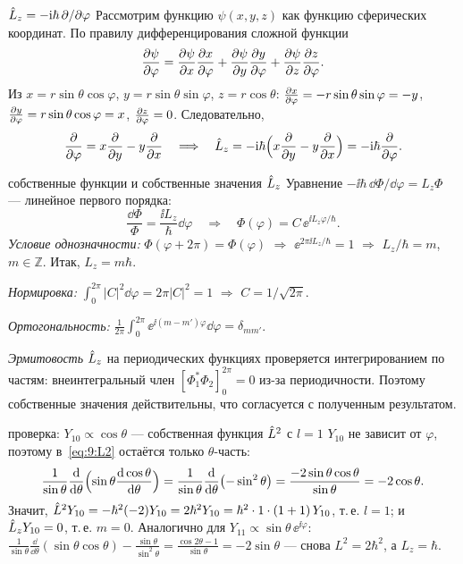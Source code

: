 \begin{derivation}[label=der:9:Lz]{$\hat{L}_z=-\mathrm{i}\hbar\,\partial/\partial\varphi$}
Рассмотрим функцию $\psi(x,y,z)$ как функцию сферических координат. По правилу дифференцирования
сложной функции
\[
  \frac{\partial \psi}{\partial \varphi}=\frac{\partial \psi}{\partial x}\frac{\partial x}{\partial \varphi}+\frac{\partial \psi}{\partial y}\frac{\partial y}{\partial \varphi}+\frac{\partial \psi}{\partial z}\frac{\partial z}{\partial \varphi}.
\]
Из $x=r\sin\theta\cos\varphi$, $y=r\sin\theta\sin\varphi$, $z=r\cos\theta$:
$\frac{\partial x}{\partial \varphi}=-r\sin\theta\sin\varphi=-y$, $\frac{\partial y}{\partial \varphi}=r\sin\theta\cos\varphi=x$, $\frac{\partial z}{\partial \varphi}=0$. Следовательно,
\[
  \frac{\partial }{\partial \varphi}=x\frac{\partial }{\partial y}-y\frac{\partial }{\partial x}\quad\Longrightarrow\quad
  \hat{L}_z=-\mathrm{i}\hbar\Bigl(x\frac{\partial }{\partial y}-y\frac{\partial }{\partial x}\Bigr)=-\mathrm{i}\hbar\frac{\partial }{\partial \varphi}.
\]
\end{derivation}

\begin{derivation}[label=der:9:eig]{собственные функции и собственные значения $\hat{L}_z$}
Уравнение $-\ii\hbar\,\dd\Phi/\dd\varphi=L_z\Phi$ — линейное первого порядка:
\[
  \frac{\dd\Phi}{\Phi}=\frac{\ii L_z}{\hbar}\dd\varphi\quad\Longrightarrow\quad\Phi(\varphi)=C\,\ee^{\ii L_z\varphi/\hbar}.
\]
\emph{Условие однозначности:} $\Phi(\varphi+2\pi)=\Phi(\varphi)$ $\Rightarrow$ $\ee^{2\pi\ii L_z/\hbar}=1$ $\Rightarrow$
$L_z/\hbar=m$, $m\in\mathbb Z$. Итак, $L_z=m\hbar$.

\emph{Нормировка:} $\int_0^{2\pi}|C|^2\dd\varphi=2\pi|C|^2=1$ $\Rightarrow$ $C=1/\sqrt{2\pi}$.

\emph{Ортогональность:} $\frac{1}{2\pi}\int_0^{2\pi}\ee^{\ii(m-m')\varphi}\dd\varphi=\delta_{mm'}$.

\emph{Эрмитовость} $\hat{L}_z$ на периодических функциях проверяется интегрированием по частям:
внеинтегральный член $[\Phi_1^*\Phi_2]_0^{2\pi}=0$ из-за периодичности. Поэтому собственные значения
действительны, что согласуется с полученным результатом.
\end{derivation}

\begin{derivation}[label=der:9:Y10]{проверка: $Y_{10}\propto\cos\theta$ — собственная функция $\hat{L}^2$ с $l=1$}
$Y_{10}$ не зависит от $\varphi$, поэтому в~\eqref{eq:9:L2} остаётся только $\theta$-часть:
\[
  \frac{1}{\sin\theta}\frac{\mathrm{d} }{\mathrm{d} \theta}\Bigl(\sin\theta\frac{\mathrm{d} \cos\theta}{\mathrm{d} \theta}\Bigr)
  =\frac{1}{\sin\theta}\frac{\mathrm{d} }{\mathrm{d} \theta}\bigl(-\sin^2\theta\bigr)=\frac{-2\sin\theta\cos\theta}{\sin\theta}=-2\cos\theta .
\]
Значит, $\hat{L}^2Y_{10}=-\hbar^2(-2)Y_{10}=2\hbar^2Y_{10}=\hbar^2\cdot1\cdot(1+1)\,Y_{10}$, т.\,е. $l=1$; и
$\hat{L}_zY_{10}=0$, т.\,е. $m=0$. Аналогично для $Y_{11}\propto\sin\theta\,\ee^{\ii\varphi}$:
$\frac{1}{\sin\theta}\frac{\dd}{\dd\theta}(\sin\theta\cos\theta)-\frac{\sin\theta}{\sin^2\theta}=\frac{\cos2\theta-1}{\sin\theta}=-2\sin\theta$ —
снова $L^2=2\hbar^2$, а $L_z=\hbar$.
\end{derivation}

